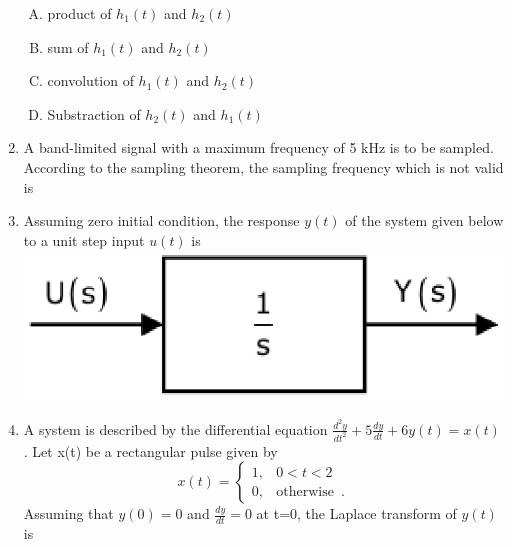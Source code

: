 \documentclass[journal,12pt,twocolumn]{IEEEtran}
\begin{document}
\begin{enumerate}
\begin{enumerate}[(A)]
\item product of $h_1(t)$ and $h_2(t)$
\item sum of $h_1(t)$ and $h_2(t)$
\item convolution of $h_1(t)$ and $h_2(t)$
\item Substraction of $h_2(t)$ and $h_1(t)$
\end{enumerate}


\item A band-limited signal with a maximum frequency of 5 kHz is to be sampled. According to the sampling theorem, the sampling frequency which is not valid is
\begin{enumerate}[(A)]

\end{enumerate}

\item Assuming zero initial condition, the response $y(t)$ of the system given below to a unit step input $u(t)$ is\\
\includegraphics[scale=0.4]{fig12.eps}
\begin{enumerate}[(A)]

\end{enumerate}

\item A system is described by the differential equation $\frac{d^{2}y}{dt^{2}}+5\frac{dy}{dt}+6y(t)=x(t)$. Let x(t)  be a rectangular pulse given by\[
	x(t)=\begin{cases}
		1, & \text{$0<t<2$}  \\
		0, & \text{otherwise }\,.
	\end{cases}
\] Assuming that $y(0)=0$ and $\frac{dy}{dt}=0$ at t=0, the Laplace transform of $y(t)$ is


\end{enumerate}
\end{document}
